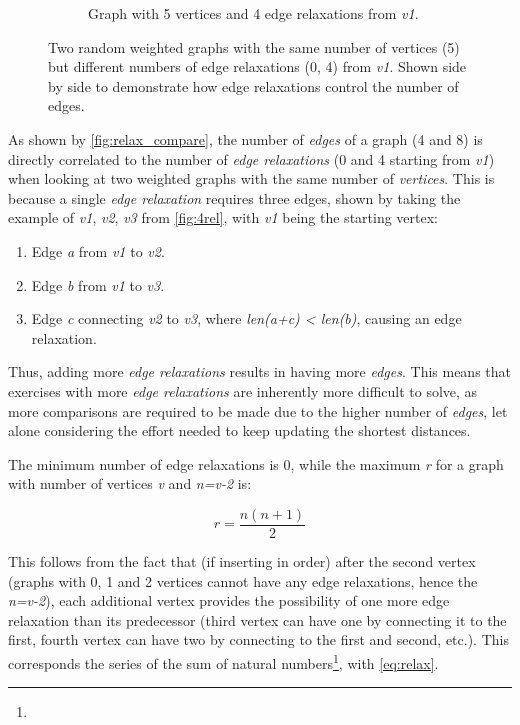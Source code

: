 \documentclass{l4proj}
\begin{document}
\begin{figure}
\begin{subfigure}[b]{0.49\textwidth}
        \caption{Graph with 5 vertices and 4 edge relaxations from \emph{v1}.}
        \label{fig:4rel}
    \end{subfigure}   
    \caption{Two random weighted graphs with the same number of vertices (5) but different numbers of edge relaxations (0, 4) from \emph{v1}. Shown side by side to demonstrate how edge relaxations control the number of edges. }\label{fig:relax_compare}
\end{figure}

As shown by \autoref{fig:relax_compare}, the number of \emph{edges} of a graph (4 and 8) is directly correlated to the number of \emph{edge relaxations} (0 and 4 starting from \emph{v1}) when looking at two weighted graphs with the same number of \emph{vertices}. This is because a single \emph{edge relaxation} requires three edges, shown by taking the example of \emph{v1}, \emph{v2}, \emph{v3} from \autoref{fig:4rel}, with \emph{v1} being the starting vertex:
\begin{enumerate}
	\item
	Edge \emph{a} from \emph{v1} to \emph{v2}.
	\item
	Edge \emph{b} from \emph{v1} to \emph{v3}.
	\item
	Edge \emph{c} connecting \emph{v2} to \emph{v3}, where \emph{len(a+c) < len(b)}, causing an edge relaxation.
\end{enumerate}

Thus, adding more \emph{edge relaxations} results in having more \emph{edges}. This means that exercises with more \emph{edge relaxations} are inherently more difficult to solve, as more comparisons are required to be made due to the higher number of \emph{edges}, let alone considering the effort needed to keep updating the shortest distances. 

The minimum number of edge relaxations is 0, while the maximum \emph{r} for a graph with number of vertices \emph{v} and \emph{n=v-2} is:

\begin{equation}
	\label{eq:relax}
	r = \frac{n (n + 1)}{2}
\end{equation}

This follows from the fact that (if inserting in order) after the second vertex (graphs with 0, 1 and 2 vertices cannot have any edge relaxations, hence the \emph{n=v-2}), each additional vertex provides the possibility of one more edge relaxation than its predecessor (third vertex can have one by connecting it to the first, fourth vertex can have two by connecting to the first and second, etc.). This corresponds the series of the sum of natural numbers\footnote{}, with \autoref{eq:relax}.
\end{document}
